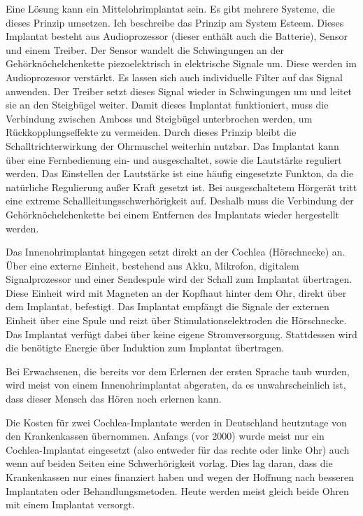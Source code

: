 Eine Lösung kann ein Mittelohrimplantat sein. Es gibt mehrere Systeme, die dieses Prinzip umsetzen.
Ich beschreibe das Prinzip am System Esteem. Dieses Implantat besteht aus Audioprozessor (dieser
enthält auch die Batterie), Sensor und einem Treiber. Der Sensor wandelt die Schwingungen an der
Gehörknöchelchenkette piezoelektrisch in elektrische Signale um. Diese werden im Audioprozessor
verstärkt. Es lassen sich auch individuelle Filter auf das Signal anwenden. Der Treiber setzt dieses
Signal wieder in Schwingungen um und leitet sie an den Steigbügel weiter. Damit dieses Implantat
funktioniert, muss die Verbindung zwischen Amboss und Steigbügel unterbrochen werden, um
Rückkopplungseffekte zu vermeiden. Durch dieses Prinzip bleibt die
Schalltrichterwirkung der Ohrmuschel weiterhin nutzbar. Das Implantat
kann über eine Fernbedienung ein- und ausgeschaltet, sowie die Lautstärke reguliert werden. Das
Einstellen der Lautstärke ist eine häufig eingesetzte Funkton, da die natürliche
Regulierung außer Kraft gesetzt ist. Bei ausgeschaltetem Hörgerät tritt eine extreme
Schallleitungsschwerhörigkeit auf. Deshalb muss die Verbindung der Gehörknöchelchenkette bei einem
Entfernen des Implantats wieder hergestellt werden.

Das Innenohrimplantat hingegen setzt direkt an der Cochlea (Hörschnecke) an. Über eine externe
Einheit, bestehend aus Akku, Mikrofon, digitalem Signalprozessor und einer Sendespule wird der
Schall zum Implantat übertragen. Diese Einheit wird mit Magneten an der Kopfhaut hinter dem Ohr,
direkt über dem Implantat, befestigt. Das Implantat empfängt die Signale der externen Einheit über
eine Spule und reizt über Stimulationselektroden die Hörschnecke. Das Implantat verfügt dabei über
keine eigene Stromversorgung. Stattdessen wird die benötigte Energie über Induktion zum Implantat
übertragen.

Bei Erwachsenen, die bereits vor dem Erlernen der ersten Sprache taub wurden, wird meist von einem
Innenohrimplantat abgeraten, da es unwahrscheinlich ist, dass dieser Mensch das Hören noch erlernen
kann.

Die Kosten für zwei Cochlea-Implantate werden in Deutschland heutzutage von den Krankenkassen
übernommen. Anfangs (vor 2000) wurde meist nur ein Cochlea-Implantat eingesetzt (also entweder für
das rechte oder linke Ohr) auch wenn auf beiden Seiten eine Schwerhörigkeit vorlag. Dies lag daran,
dass die Krankenkassen nur eines finanziert haben und wegen der Hoffnung nach besseren Implantaten
oder Behandlungsmetoden. Heute werden meist gleich beide Ohren mit einem Implantat versorgt.

